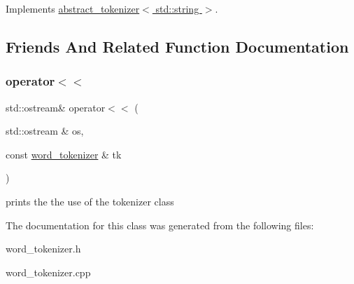 Implements \hyperlink{classabstract__tokenizer_aeea4a861fdfa18351555b0d00a378165}{abstract\+\_\+tokenizer$<$ std\+::string $>$}.



\subsection{Friends And Related Function Documentation}
\mbox{\label{classword__tokenizer_a570983076ba46499d5bebccccac99a4a}} 
\subsubsection{\texorpdfstring{operator$<$$<$}{operator<<}}
{\footnotesize\ttfamily std\+::ostream\& operator$<$$<$ (\begin{DoxyParamCaption}\item[{std\+::ostream \&}]{os,  }\item[{const \hyperlink{classword__tokenizer}{word\+\_\+tokenizer} \&}]{tk }\end{DoxyParamCaption})\hspace{0.3cm}{\ttfamily [friend]}}

prints the the use of the tokenizer class 

The documentation for this class was generated from the following files\+:\begin{DoxyCompactItemize}
\item 
word\+\_\+tokenizer.\+h\item 
word\+\_\+tokenizer.\+cpp\end{DoxyCompactItemize}
